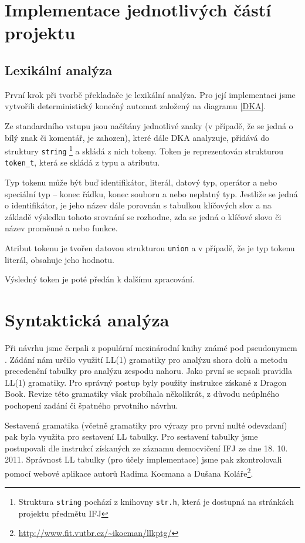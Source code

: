 \documentclass[12pt]{article}
\begin{document}
    \section{Implementace jednotlivých částí projektu}
        \subsection{Lexikální analýza}
        \label{lex}
            První krok při tvorbě překladače je lexikální analýza. Pro její implementaci jsme vytvořili deterministický konečný automat založený na diagramu \ref{DKA}.
            
            Ze standardního vstupu jsou načítány jednotlivé znaky (v případě, že se jedná o bílý znak či komentář, je zahozen), které dále DKA analyzuje, přidává do struktury \verb!string! \footnote{Struktura {\texttt{string}} pochází z knihovny {\texttt{str.h}}, která je dostupná na stránkách projektu předmětu IFJ} a skládá z nich tokeny. Token je reprezentován strukturou \verb!token_t!, která se skládá z typu a atributu.
            
            Typ tokenu může být buď identifikátor, literál, datový typ, operátor a nebo spe\-ciální typ -- konec řádku, konec souboru a nebo neplatný typ. Jestliže se jedná o identifikátor, je jeho název dále porovnán s tabulkou klíčových slov a na základě výsledku tohoto srovnání se rozhodne, zda se jedná o klíčové slovo či název proměnné a nebo funkce.
            
            Atribut tokenu je tvořen datovou strukturou \verb!union! a v případě, že je typ tokenu literál, obsahuje jeho hodnotu.
            
            Výsledný token je poté předán k dalšímu zpracování.
    
    \newpage
    \section{Syntaktická analýza}
        Při návrhu jsme čerpali z populární mezinárodní knihy známé pod pseudonymem  \cite{DragonBookSyn}.
        Zádání nám určilo využití LL(1) gramatiky pro analýzu shora dolů a metodu precedenční tabulky pro analýzu zespodu nahoru. Jako první se sepsali pravidla LL(1) gramatiky. Pro správný postup byly použity instrukce získané z Dragon Book. Revize této gramatiky však probíhala několikrát, z důvodu neúplného pochopení zadání či špatného prvotního návrhu. 
        
        Sestavená gramatika (včetně gramatiky pro výrazy pro první nulté odevzdaní) pak byla využita pro sestavení LL tabulky. Pro sestavení tabulky jsme postupovali dle instrukcí získaných ze záznamu democvičení IFJ ze dne 18. 10. 2011. Správnost LL tabulky (pro účely implementace) jsme pak zkontrolovali pomocí webové aplikace autorů Radima Kocmana a Dušana Koláře\footnote{\url{http://www.fit.vutbr.cz/~ikocman/llkptg/}}.
\end{document}
